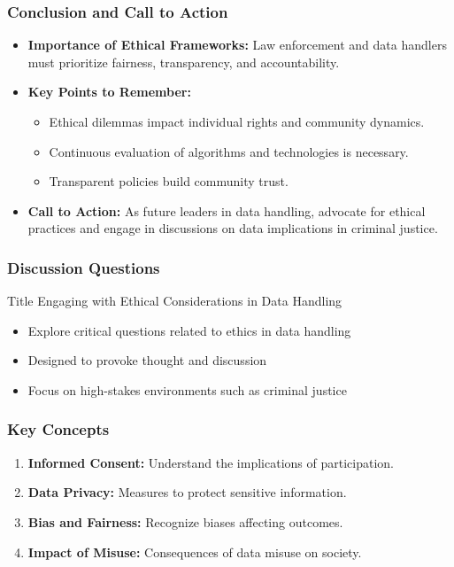 \documentclass[aspectratio=169]{beamer}
\begin{document}
\begin{frame}[fragile]
    \frametitle{Conclusion and Call to Action}
    \begin{itemize}
        \item \textbf{Importance of Ethical Frameworks:} Law enforcement and data handlers must prioritize fairness, transparency, and accountability.
        \item \textbf{Key Points to Remember:}
        \begin{itemize}
            \item Ethical dilemmas impact individual rights and community dynamics.
            \item Continuous evaluation of algorithms and technologies is necessary.
            \item Transparent policies build community trust.
        \end{itemize}
        \item \textbf{Call to Action:} As future leaders in data handling, advocate for ethical practices and engage in discussions on data implications in criminal justice.
    \end{itemize}
\end{frame}

\begin{frame}[fragile]
    \frametitle{Discussion Questions}
    \begin{block}{Title}
        Engaging with Ethical Considerations in Data Handling
    \end{block}
    
    \begin{itemize}
        \item Explore critical questions related to ethics in data handling
        \item Designed to provoke thought and discussion
        \item Focus on high-stakes environments such as criminal justice
    \end{itemize}
\end{frame}

\begin{frame}[fragile]
    \frametitle{Key Concepts}
    
    \begin{enumerate}
        \item \textbf{Informed Consent:} Understand the implications of participation.
        \item \textbf{Data Privacy:} Measures to protect sensitive information.
        \item \textbf{Bias and Fairness:} Recognize biases affecting outcomes.
        \item \textbf{Impact of Misuse:} Consequences of data misuse on society.
    \end{enumerate}
\end{frame}
\end{document}
